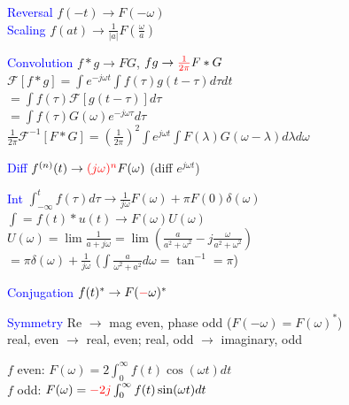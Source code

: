 \documentclass[4pt]{article}
\theoremstyle{definition}
\theoremstyle{definition}
\renewcommand{\o}{\omega}
\newcommand{\ra}{\rightarrow}
\newcommand{\red}[1]{\textcolor{red}{#1}}
\newcommand{\blue}[1]{\textcolor{blue}{#1}}
\begin{document}
\begin{landscape}
\begin{multicols}{3}
    \blue{Reversal} \(f(-t)\ra F(-\o)\)\\
    \blue{Scaling} \(f(at)\ra \frac{1}{|a|}F(\frac{\o}{a})\)   %

    \blue{Convolution} \(f*g \ra FG\), \(fg \ra \red{\frac{1}{2\pi}} F*G\)\\
        \hspace{1em} \(\mathcal F[f*g] = \int e^{-j\o t} \int f(\tau) g(t-\tau)d\tau dt\)\\
            \hspace{2em} \(=\int f(\tau) \mathcal F[g(t-\tau)]  d\tau \)\\
            \hspace{2em} \(= \int f(\tau) G(\o)e^{-j\o\tau}d\tau\)\\
        \hspace{1em} \( \frac{1}{2\pi} \mathcal{F}^{-1}[F * G] = (\frac{1}{2\pi})^2 \int e^{j\o t} \int F(\lambda) G(\o - \lambda) d\lambda d\o\)

    \blue{Diff} \(f^{(n)}(t) \ra \red{(j\o)^n} F(\o)\) (diff $e^{j\o t}$) 
    
    \blue{Int} \(\int_{-\infty}^t f(\tau)d\tau \ra \frac{1}{j\o}F(\o) + \pi F(0) \delta(\o)\)\\
        \hspace{1em} $\int = f(t) * u(t) \ra F(\o)U(\o)$\\
        \hspace{1em} \(U(\o) = \lim \frac{1}{a+j\o} = \lim (\frac{a}{a^2+\o^2} - j\frac{\o}{a^2+\o^2}) \) \\
            \hspace{2em} \(= \pi\delta(\o) + \frac{1}{j\o}\) ($\int \frac{a}{\o^2+a^2}d\o = \tan^{-1}=\pi$)

    \blue{Conjugation} \(f(t)^* \ra F(\red{-} \o)^*\)

    \blue{Symmetry} Re $\ra$ mag even, phase odd ($F(-\o) = F(\o)^*$)\\
    real, even $\ra$ real, even; real, odd $\ra$ imaginary, odd

    $f$ even: \(F(\o) = 2\int_0^{\infty} f(t)\cos(\o t) dt\)\\
    $f$ odd: \(F(\o) = \red{-2j}\int_0^{\infty} f(t) \sin(\o t) dt\)
\newpage

\end{multicols}
\end{landscape}
\end{document}
